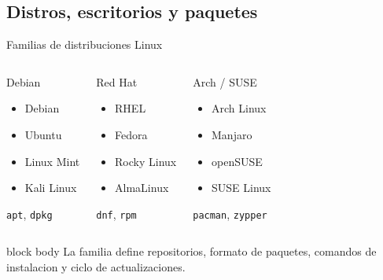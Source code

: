 \documentclass[aspectratio=169]{beamer}
\begin{document}
\subsection{Distros, escritorios y paquetes}
\begin{frame}{Familias de distribuciones Linux}
  \small
  \begin{columns}[t]
    \begin{block}{Debian}
      \begin{itemize}
        \item Debian
        \item Ubuntu
        \item Linux Mint
        \item Kali Linux
      \end{itemize}
      \centering\texttt{apt}, \texttt{dpkg}
    \end{block}
    \begin{alertblock}{Red Hat}
      \begin{itemize}
        \item RHEL
        \item Fedora
        \item Rocky Linux
        \item AlmaLinux
      \end{itemize}
      \centering\texttt{dnf}, \texttt{rpm}
    \end{alertblock}
    \begin{exampleblock}{Arch / SUSE}
      \begin{itemize}
        \item Arch Linux
        \item Manjaro
        \item openSUSE
        \item SUSE Linux
      \end{itemize}
      \centering\texttt{pacman}, \texttt{zypper}
    \end{exampleblock}
  \end{columns}
  \vfill
  \begin{beamercolorbox}[rounded=true, shadow=false, sep=4pt, center]{block body}
    \small La familia define repositorios, formato de paquetes, comandos de instalacion y ciclo de actualizaciones.
  \end{beamercolorbox}
\end{frame}
\end{document}
